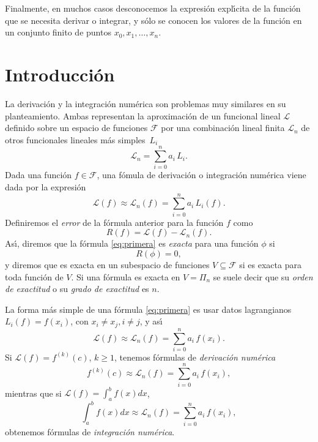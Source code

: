 Finalmente, en muchos casos desconocemos la expresi\'on expl\'{\i}cita de la funci\'on que se necesita derivar o integrar, y s\'olo se conocen los valores de la funci\'on en un conjunto finito de puntos $x_0, x_1,\ldots, x_n$.

\section{Introducci\'on}

La derivaci\'on y la integraci\'on num\'erica son problemas muy
similares en su planteamiento. Ambas representan la aproximaci\'on
de un funcional lineal $\mathcal{L}$ definido sobre un espacio de funciones $\mathcal{F}$ 
por una combinaci\'on lineal finita
$\mathcal{L}_n$ de otros funcionales lineales m\'as sim\-ples~$L_i$
$$
  \mathcal{L}_n = \sum_{i=0}^n a_i\,L_i.    
$$
Dada una funci\'on $f\in \mathcal{F}$, una f\'omula de derivaci\'on o integraci\'on num\'erica viene dada por
la expresi\'on
\begin{equation}
\mathcal{L}(f) \approx \mathcal{L}_n(f) = \sum_{i=0}^n a_i\,L_i(f). \label{eq:primera}
\end{equation}
Definiremos el {\it error} de la f\'ormula anterior para la funci\'on $f$ como
$$R(f) = \mathcal{L}(f) - \mathcal{L}_n(f).
$$
As\'{\i}, diremos que la f\'ormula \eqref{eq:primera} es {\it exacta} para una funci\'on $\phi$ si
$$R(\phi) = 0,$$
y diremos que es exacta en un subespacio de funciones $V \subseteq \mathcal{F}$ si es exacta para toda funci\'on de $V$. Si una f\'ormula es exacta en
$V=\Pi_n$ se suele decir que su {\it orden de exactitud} o su {\it grado de exactitud} es $n$.

La forma m\'as simple de una f\'ormula \eqref{eq:primera} es usar datos lagrangianos $L_i(f) = f(x_i)$, con $x_i\neq x_j, i\neq j$, y as\'{\i}
\begin{equation}\label{lagr}
\mathcal{L}(f) \approx \mathcal{L}_n(f)=\sum_{i=0}^n a_i\,f(x_i).
\end{equation}
Si $\mathcal{L}(f) = f^{(k)}(c)$, $k\ge1$, tenemos f\'ormulas de {\it derivaci\'on num\'erica}
\begin{equation}\label{eq:dernum}
  f^{(k)}(c) \approx \mathcal{L}_n(f)=\sum_{i=0}^n a_i\,f(x_i),  
\end{equation}
mientras que si $\displaystyle \mathcal{L}(f)=\int_a^b\!\! f(x)dx$, 
\begin{equation}\label{eq:intnum}
  \int_a^b\!\! f(x)dx \approx \mathcal{L}_n(f)=\sum_{i=0}^n a_i\,f(x_i),  
\end{equation}
obtenemos f\'ormulas de {\it integraci\'on num\'erica}.


